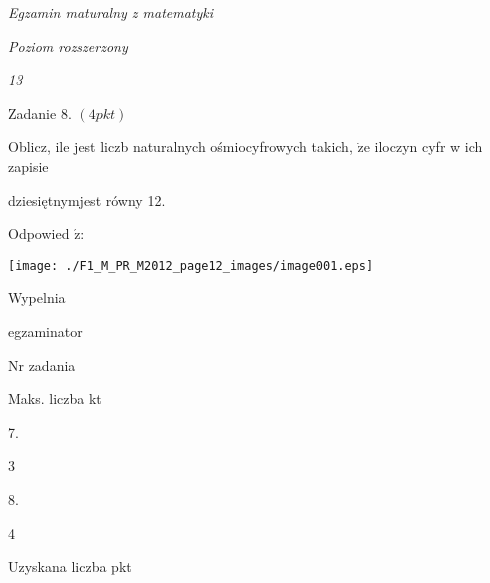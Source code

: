 \documentclass[a4paper,12pt]{article}
\begin{document}
{\it Egzamin maturalny z matematyki}

{\it Poziom rozszerzony}

{\it 13}

Zadanie 8. $(4pkt)$

Oblicz, ile jest liczb naturalnych ośmiocyfrowych takich, $\dot{\mathrm{z}}\mathrm{e}$ iloczyn cyfr w ich zapisie

dziesiętnymjest równy 12.

Odpowied $\acute{\mathrm{z}}$:
\begin{center}
\texttt{[image: ./F1\_M\_PR\_M2012\_page12\_images/image001.eps]}
\end{center}
Wypelnia

egzaminator

Nr zadania

Maks. liczba kt

7.

3

8.

4

Uzyskana liczba pkt
\end{document}
